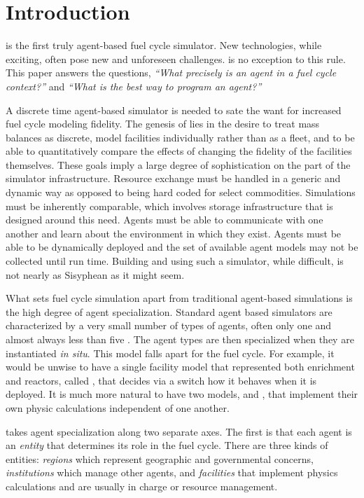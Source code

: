 \section{Introduction}
\label{sec-intro}

\Cyclus \citeme is the first truly agent-based \citeme fuel cycle simulator. 
New technologies, while exciting, often pose new and unforeseen challenges.
\Cyclus is no exception to this rule.  This paper answers the questions,
\emph{``What precisely is an agent in a fuel cycle context?''} and 
\emph{``What is the best way to program an agent?''}

A discrete time agent-based simulator is needed to sate the want for increased 
fuel cycle modeling fidelity. The genesis of \cyclus lies in the desire to 
treat mass balances as discrete, model facilities individually rather than as 
a fleet, and to be able to quantitatively compare the effects of changing the 
fidelity of the facilities themselves. These goals imply a large degree of 
sophistication on the part of the simulator infrastructure.  Resource exchange
must be handled in a generic and dynamic way as opposed to being hard coded 
for select commodities. Simulations must be inherently comparable, which involves 
storage infrastructure that is designed around this need. Agents must be able 
to communicate with one another and learn about the environment in which they 
exist. Agents must be able to be dynamically deployed and the set of 
available agent models may not be collected until run time. Building and using such a
simulator, while difficult, is not nearly as Sisyphean as it might seem. 

What sets fuel cycle simulation apart from traditional agent-based simulations 
is the high degree of agent specialization. Standard agent based simulators
are characterized by a very small number of types of agents, often only one and 
almost always less than five \citeme. The agent types are then specialized 
when they are instantiated \emph{in situ}. This model falls apart for the 
fuel cycle.  For example, it would be unwise to have a single facility model 
that represented both enrichment and reactors, called ,
that decides via a switch how it behaves when it is deployed. It is much 
more natural to have two models,  and , 
that implement their own physic calculations independent of one another.

\Cyclus takes agent specialization along two separate axes. The first is 
that each agent is an \emph{entity} that determines its role in the 
fuel cycle. There are three kinds of entities: \emph{regions} which 
represent geographic and governmental concerns, \emph{institutions} 
which manage other agents, and \emph{facilities} that implement 
physics calculations and are usually in charge or resource management.

